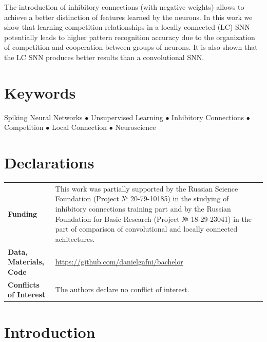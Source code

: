 \documentclass[a4paper,10pt]{article}
\begin{document}
The introduction of inhibitory connections (with negative weights) allows to achieve a better distinction of features learned by the neurons. In this work we show that learning competition relationships in a locally connected (LC) SNN potentially leads to higher pattern recognition accuracy due to the organization of competition and cooperation between groups of neurons. It is also shown that the LC SNN produces better results than a convolutional SNN.

\section*{Keywords}
Spiking Neural Networks $\bullet$ Unsupervised Learning $\bullet$ Inhibitory Connections $\bullet$ Competition $\bullet$ Local Connection $\bullet$ Neuroscience

\section*{Declarations}

\begin{flushleft}
 \begin{tabularx}{\textwidth}{lm{12cm}}
  \textbf{Funding} & {This work was partially supported by the Russian Science Foundation (Project № 20-79-10185) in the studying of inhibitory connections training part and by the Russian Foundation for Basic Research (Project № 18-29-23041) in the part of comparison of convolutional and locally connected achitectures.} \\
  \textbf{Data, Materials, Code} & {\href{https://github.com/danielgafni/bachelor}{https://github.com/danielgafni/bachelor}} \\
  \textbf{Conflicts of Interest} & {The authors declare no conflict of interest.} \\
 \end{tabularx}
\end{flushleft}

\pagebreak

\section*{Introduction}
\end{document}
